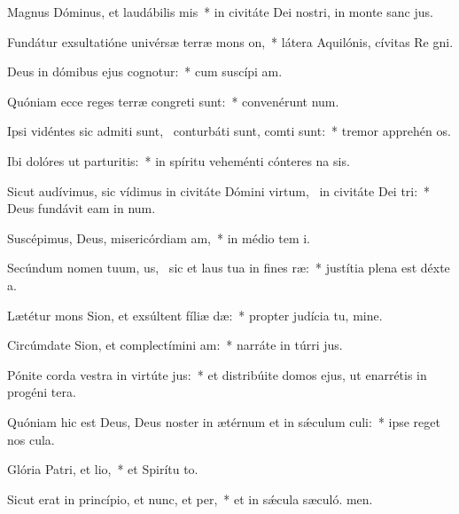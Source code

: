 \item Magnus Dóminus, et laudábilis mis~* in civitáte Dei nostri, in monte sanc jus.
\item Fundátur exsultatióne univérsæ terræ mons on,~* látera Aquilónis, cívitas Re gni.
\item Deus in dómibus ejus cognotur:~* cum suscípi am.
\item Quóniam ecce reges terræ congreti sunt:~* convenérunt  num.
\item Ipsi vidéntes sic admiti sunt,~\pscross{} conturbáti sunt, comti sunt:~* tremor apprehén os.
\item Ibi dolóres ut parturitis:~* in spíritu veheménti cónteres na sis.
\item Sicut audívimus, sic vídimus in civitáte Dómini virtum,~\pscross{} in civitáte Dei tri:~* Deus fundávit eam in num.
\item Suscépimus, Deus, misericórdiam am,~* in médio tem i.
\item Secúndum nomen tuum, us,~\pscross{} sic et laus tua in fines ræ:~* justítia plena est déxte a.
\item Lætétur mons Sion, et exsúltent fíliæ dæ:~* propter judícia tu, mine.
\item Circúmdate Sion, et complectímini am:~* narráte in túrri jus.
\item Pónite corda vestra in virtúte jus:~* et distribúite domos ejus, ut enarrétis in progéni tera.
\item Quóniam hic est Deus, Deus noster in ætérnum et in sǽculum culi:~* ipse reget nos  cula.
\item Glória Patri, et lio,~* et Spirítu to.
\item Sicut erat in princípio, et nunc, et per,~* et in sǽcula sæculó. men.
